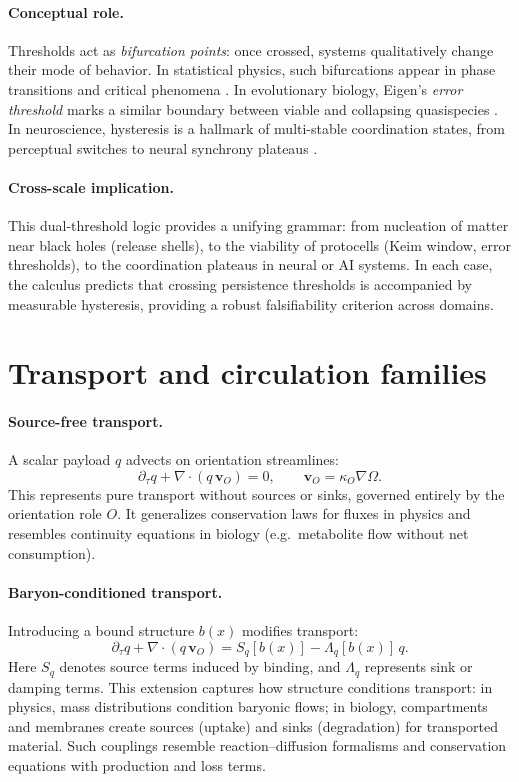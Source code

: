 \documentclass[12pt,a4paper,oneside]{scrreprt}
\begin{document}
\paragraph{Conceptual role.} 
Thresholds act as \emph{bifurcation points}: once crossed, systems qualitatively 
change their mode of behavior. 
In statistical physics, such bifurcations appear in phase transitions 
and critical phenomena \citep{Stanley1971Phase}. 
In evolutionary biology, Eigen’s \emph{error threshold} marks a similar 
boundary between viable and collapsing quasispecies \citep{Eigen1971,Szathmary1995}. 
In neuroscience, hysteresis is a hallmark of multi-stable coordination states, 
from perceptual switches to neural synchrony plateaus \citep{Kelso1995Coordination}. 

\paragraph{Cross-scale implication.} 
This dual-threshold logic provides a unifying grammar: 
from nucleation of matter near black holes (release shells), 
to the viability of protocells (Keim window, error thresholds), 
to the coordination plateaus in neural or AI systems. 
In each case, the calculus predicts that crossing persistence thresholds 
is accompanied by measurable hysteresis, providing a robust falsifiability 
criterion across domains.

\section{Transport and circulation families}\label{sec:ur-families}

\paragraph{Source-free transport.} 
A scalar payload $q$ advects on orientation streamlines:
\[
\partial_{\tau} q + \nabla \!\cdot (q\, \mathbf v_O) = 0, 
\qquad \mathbf v_O = \kappa_O \nabla \Omega.
\]
This represents pure transport without sources or sinks, governed entirely by the 
orientation role $O$. 
It generalizes conservation laws for fluxes in physics and resembles continuity 
equations in biology (e.g.\ metabolite flow without net consumption).

\paragraph{Baryon-conditioned transport.} 
Introducing a bound structure $b(x)$ modifies transport:
\[
\partial_{\tau} q + \nabla \!\cdot (q\, \mathbf v_O) 
= S_q[b(x)] - \Lambda_q[b(x)] \, q .
\]
Here $S_q$ denotes source terms induced by binding, 
and $\Lambda_q$ represents sink or damping terms. 
This extension captures how structure conditions transport: 
in physics, mass distributions condition baryonic flows; 
in biology, compartments and membranes create sources (uptake) 
and sinks (degradation) for transported material. 
Such couplings resemble reaction–diffusion formalisms \citep{Turing1952Morphogenesis}
and conservation equations with production and loss terms.
\end{document}
